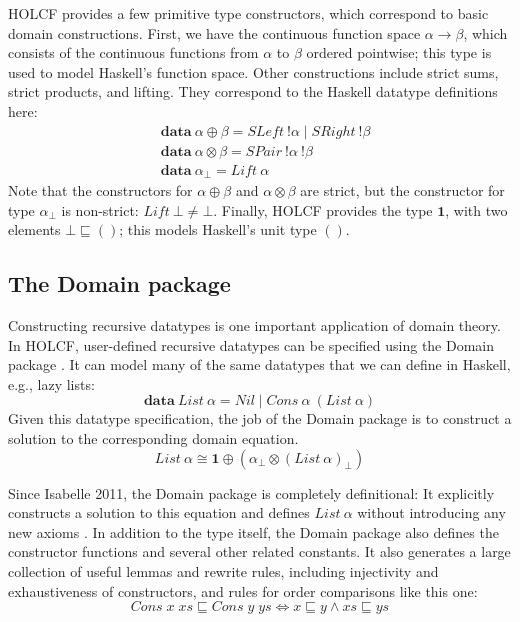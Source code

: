 \documentclass{sigplanconf}
\newcommand{\below}{\sqsubseteq}
\newcommand{\hsone}{\mathbf{1}}
\newcommand{\kwd}[1]{\mathbf{#1}}
\newcommand{\hsc}[1]{\ensuremath{\mathit{#1}}}
\newcommand{\tA}{\alpha}
\newcommand{\tB}{\beta}
\theoremstyle{definition}
\begin{document}
HOLCF provides a few primitive type constructors, which correspond to basic domain constructions. First, we have the continuous function space $\tA\to\tB$, which consists of the continuous functions from $\tA$ to $\tB$ ordered pointwise; this type is used to model Haskell's function space. Other constructions include strict sums, strict products, and lifting. They correspond to the Haskell datatype definitions here:
%
\begin{align*}
& \kwd{data}\:\tA\oplus\tB = \hsc{SLeft}\:!\tA \mid \hsc{SRight}\:!\tB \\
& \kwd{data}\:\tA\otimes\tB = \hsc{SPair}\:!\tA\:!\tB \\
& \kwd{data}\:\tA_\bot = \hsc{Lift}\:\tA
\end{align*}
%
Note that the constructors for $\tA\oplus\tB$ and $\tA\otimes\tB$ are strict, but the constructor for type $\tA_\bot$ is non-strict: $\hsc{Lift}\:\bot \neq \bot$. Finally, HOLCF provides the type $\hsone$, with two elements $\bot \below ()$; this models Haskell's unit type $()$.

\subsection{The Domain package}

Constructing recursive datatypes is one important application of domain theory. In HOLCF, user-defined recursive datatypes can be specified using the Domain package \cite{holcf11}. It can model many of the same datatypes that we can define in Haskell, e.g., lazy lists:
%
\begin{equation*}
\kwd{data}\:List\:\tA = \hsc{Nil} \mid \hsc{Cons}\:\tA\:(\hsc{List}\:\tA)
\end{equation*}
%
Given this datatype specification, the job of the Domain package is to construct a solution to the corresponding domain equation.
%
\begin{equation}
\hsc{List}\:\tA \cong \hsone \oplus (\tA_\bot \otimes (\hsc{List}\:\tA)_\bot)
\end{equation}

Since Isabelle 2011, the Domain package is completely definitional: It explicitly constructs a solution to this equation and defines $\hsc{List}\:\tA$ without introducing any new axioms \cite{holcf11}. In addition to the type itself, the Domain package also defines the constructor functions and several other related constants. It also generates a large collection of useful lemmas and rewrite rules, including injectivity and exhaustiveness of constructors, and rules for order comparisons like this one:
%
\begin{equation}
\hsc{Cons}\;x\;xs \below \hsc{Cons}\;y\;ys \Longleftrightarrow x \below y \wedge xs \below ys
\end{equation}
\end{document}
